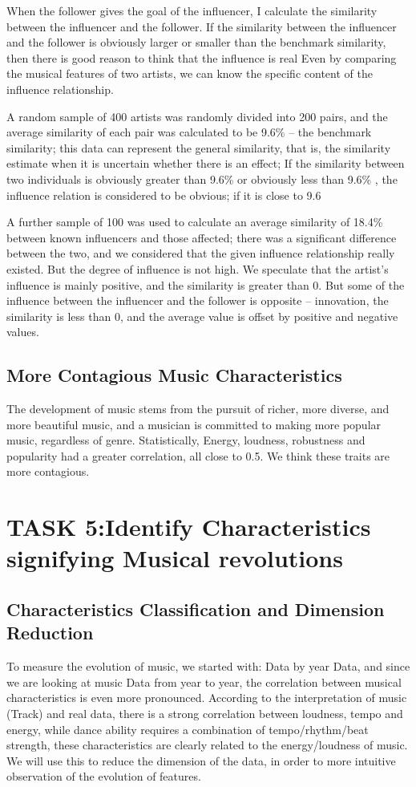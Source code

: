 \documentclass[conference]{IEEEtran}
\begin{document}
When the follower gives the goal of the influencer, I calculate the similarity between the influencer and the follower. If the similarity between the influencer and the follower is obviously larger or smaller than the benchmark similarity, then there is good reason to think that the influence is real Even by comparing the musical features of two artists, we can know the specific content of the influence relationship.

A random sample of 400 artists was randomly divided into 200 pairs, and the average similarity of each pair was calculated to be 9.6\% -- the benchmark similarity; this data can represent the general similarity, that is, the similarity estimate when it is uncertain whether there is an effect; If the similarity between two individuals is obviously greater than 9.6\% or obviously less than 9.6\% , the influence relation is considered to be obvious; if it is close to 9.6%

A further sample of 100 was used to calculate an average similarity of 18.4\% between known influencers and those affected; there was a significant difference between the two, and we considered that the given influence relationship really existed. But the degree of influence is not high. We speculate that the artist’s influence is mainly positive, and the similarity is greater than 0. But some of the influence between the influencer and the follower is opposite -- innovation, the similarity is less than 0, and the average value is offset by positive and negative values.
\subsection{More Contagious Music Characteristics}
The development of music stems from the pursuit of richer, more diverse, and more beautiful music, and a musician is committed to making more popular music, regardless of genre.
Statistically, Energy, loudness, robustness and popularity had a greater correlation, all close to 0.5. We think these traits are more contagious.

\section{TASK 5:Identify Characteristics signifying Musical revolutions}
\subsection{Characteristics Classification and Dimension Reduction}
To measure the evolution of music, we started with: Data by year Data, and since we are looking at music Data from year to year, the correlation between musical characteristics is even more pronounced. According to the interpretation of music (Track) and real data, there is a strong correlation between loudness, tempo and energy, while dance ability requires a combination of tempo/rhythm/beat strength, these characteristics are clearly related to the energy/loudness of music. We will use this to reduce the dimension of the data, in order to more intuitive observation of the evolution of features.
\end{document}

